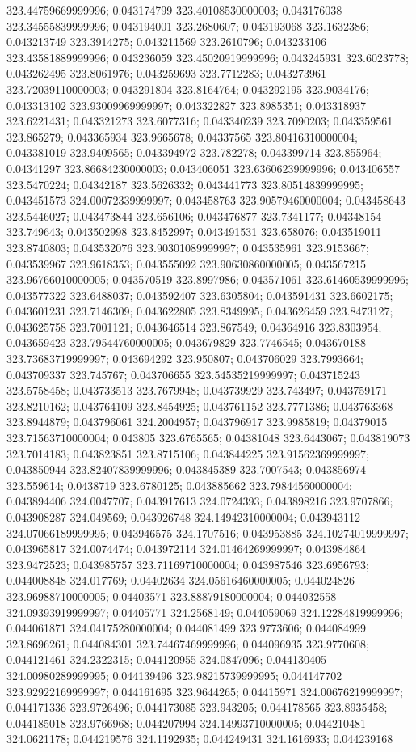 323.44759669999996; 0.043174799 323.40108530000003; 0.043176038 323.34555839999996; 0.043194001 323.2680607; 0.043193068 323.1632386; 0.043213749 323.3914275; 0.043211569 323.2610796; 0.043233106 323.43581889999996; 0.043236059 323.45020919999996; 0.043245931 323.6023778; 0.043262495 323.8061976; 0.043259693 323.7712283; 0.043273961 323.72039110000003; 0.043291804 323.8164764; 0.043292195 323.9034176; 0.043313102 323.93009969999997; 0.043322827 323.8985351; 0.043318937 323.6221431; 0.043321273 323.6077316; 0.043340239 323.7090203; 0.043359561 323.865279; 0.043365934 323.9665678; 0.04337565 323.80416310000004; 0.043381019 323.9409565; 0.043394972 323.782278; 0.043399714 323.855964; 0.04341297 323.86684230000003; 0.043406051 323.63606239999996; 0.043406557 323.5470224; 0.04342187 323.5626332; 0.043441773 323.80514839999995; 0.043451573 324.00072339999997; 0.043458763 323.90579460000004; 0.043458643 323.5446027; 0.043473844 323.656106; 0.043476877 323.7341177; 0.04348154 323.749643; 0.043502998 323.8452997; 0.043491531 323.658076; 0.043519011 323.8740803; 0.043532076 323.90301089999997; 0.043535961 323.9153667; 0.043539967 323.9618353; 0.043555092 323.90630860000005; 0.043567215 323.96766010000005; 0.043570519 323.8997986; 0.043571061 323.61460539999996; 0.043577322 323.6488037; 0.043592407 323.6305804; 0.043591431 323.6602175; 0.043601231 323.7146309; 0.043622805 323.8349995; 0.043626459 323.8473127; 0.043625758 323.7001121; 0.043646514 323.867549; 0.04364916 323.8303954; 0.043659423 323.79544760000005; 0.043679829 323.7746545; 0.043670188 323.73683719999997; 0.043694292 323.950807; 0.043706029 323.7993664; 0.043709337 323.745767; 0.043706655 323.54535219999997; 0.043715243 323.5758458; 0.043733513 323.7679948; 0.043739929 323.743497; 0.043759171 323.8210162; 0.043764109 323.8454925; 0.043761152 323.7771386; 0.043763368 323.8944879; 0.043796061 324.2004957; 0.043796917 323.9985819; 0.04379015 323.71563710000004; 0.043805 323.6765565; 0.04381048 323.6443067; 0.043819073 323.7014183; 0.043823851 323.8715106; 0.043844225 323.91562369999997; 0.043850944 323.82407839999996; 0.043845389 323.7007543; 0.043856974 323.559614; 0.0438719 323.6780125; 0.043885662 323.79844560000004; 0.043894406 324.0047707; 0.043917613 324.0724393; 0.043898216 323.9707866; 0.043908287 324.049569; 0.043926748 324.14942310000004; 0.043943112 324.07066189999995; 0.043946575 324.1707516; 0.043953885 324.10274019999997; 0.043965817 324.0074474; 0.043972114 324.01464269999997; 0.043984864 323.9472523; 0.043985757 323.71169710000004; 0.043987546 323.6956793; 0.044008848 324.017769; 0.04402634 324.05616460000005; 0.044024826 323.96988710000005; 0.04403571 323.88879180000004; 0.044032558 324.09393919999997; 0.04405771 324.2568149; 0.044059069 324.12284819999996; 0.044061871 324.04175280000004; 0.044081499 323.9773606; 0.044084999 323.8696261; 0.044084301 323.74467469999996; 0.044096935 323.9770608; 0.044121461 324.2322315; 0.044120955 324.0847096; 0.044130405 324.00980289999995; 0.044139496 323.98215739999995; 0.044147702 323.92922169999997; 0.044161695 323.9644265; 0.04415971 324.00676219999997; 0.044171336 323.9726496; 0.044173085 323.943205; 0.044178565 323.8935458; 0.044185018 323.9766968; 0.044207994 324.14993710000005; 0.044210481 324.0621178; 0.044219576 324.1192935; 0.044249431 324.1616933; 0.044239168 